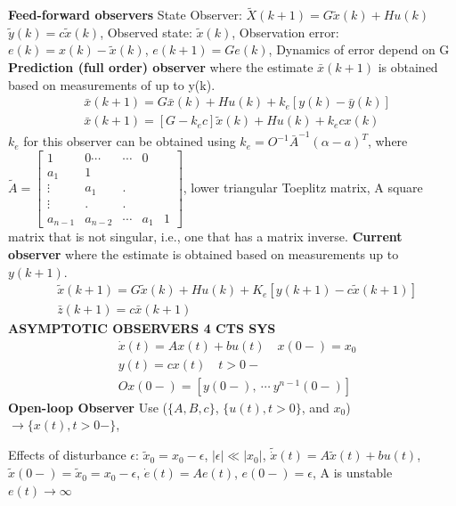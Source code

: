 \begin{multicols*}{3}
\textbf{Feed-forward observers} State Observer: $\tilde{X}(k+1)=G\tilde{x}(k)+Hu(k)$
$\tilde{y}(k)=c \tilde{x}(k)$, Observed state: $\tilde{x}(k)$, Observation error: $e(k)=x(k)-\tilde{x}(k)$, $e(k+1)=Ge(k)$, Dynamics of error depend on G \hfill \break 
\textbf{Prediction (full order) observer} where the estimate $\bar{x}(k+1)$ is obtained based on measurements of up to y(k).
\vspace*{-0.2cm}
\begin{align*}
& \bar{x}(k+1)=G\bar{x}(k)+Hu(k)+k_e[y(k)-\bar{y}(k)] \\
& \bar{x}(k+1)=[G-k_e c] \tilde{x}(k)+Hu(k)+k_ecx(k)
\end{align*}
$k_e$ for this observer can be obtained 
using $k_e=O^{-1}\bar{A}^{-1}(\alpha-a)^T$, where \hfill \break 
$\tilde{A}=\begin{bmatrix}
1   & 0 \cdots & \cdots & 0 \\
a_1 & 1 & & \\
\vdots & a_1 & . &  \\
\vdots & . & . & \\
a_{n-1} & a_{n-2} & \cdots & a_1 & 1
\end{bmatrix}$, \hfill \break  lower triangular Toeplitz matrix, A square matrix that is not singular, i.e., one that has a matrix inverse.
\textbf{Current observer} where the estimate is obtained based on measurements
up to $y(k+1)$.
\vspace*{-0.15cm}
\begin{align*}
& \tilde{x}(k+1)=G\tilde{x}(k)+Hu(k)+K_e[y(k+1)-c\tilde{x}(k+1)] \\
& \bar{z}(k+1)=c\bar{x}(k+1)
\end{align*}
\vspace*{-0.15cm}
\textbf{ASYMPTOTIC OBSERVERS 4 CTS
SYS} 
\vspace*{-0.15cm}
\begin{align*}
& \dot{x}(t) = A x(t)+bu(t) \quad x(0-)=x_0 \\
& y(t) = cx(t) \quad t > 0- \\
& O x(0-) = [y(0-), \ \cdots \ y^{n-1}(0-)]
\end{align*}
\textbf{Open-loop Observer}
Use ($\{A,B,c\}$, $\{u(t), t> 0\}$, and $x_0$) $\rightarrow \{x(t),t>0-\}$,

Effects of disturbance $\epsilon$:
$\tilde{x}_0=x_0-\epsilon$, $|\epsilon| \ll |x_0|$, $\tilde{\dot{x}}(t)=A \tilde{x}(t)+bu(t)$, $\tilde{x}(0-)=\tilde{x}_0=x_0-\epsilon$,
$\dot{e}(t)=Ae(t)$, $e(0-)=\epsilon$, A is unstable $e(t) \rightarrow \infty$


\end{multicols*}
